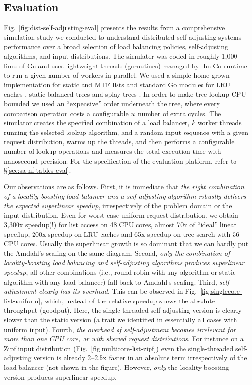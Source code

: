 \subsection{Evaluation}
\label{sec:sims}

Fig.~\ref{fig:dist-self-adjusting-eval} presents the results from a comprehensive simulation study we conducted to understand distributed self-adjusting systems performance over a broad selection of load balancing policies, self-adjusting algorithms, and input distributions. The simulator was coded in roughly 1,000 lines of Go and uses lightweight threads (goroutines) managed by the Go runtime to run a given number of workers in parallel. We used a simple home-grown implementation for static and MTF lists and standard Go modules for LRU caches \cite{golang-lru}, static balanced trees \cite{golang-btree} and splay trees \cite{golang-splay}. In order to make tree lookup CPU bounded we used an ``expensive'' order underneath the tree, where every comparison operation costs a configurable $w$ number of extra cycles. The simulator creates the specified combination of a load balancer, $k$ worker threads running the selected lookup algorithm, and a random input sequence with a given request distribution, warms up the threads, and then performs a configurable number of lookup operations and measures the total execution time with nanosecond precision. For the specification of the evaluation platform, refer to \S\ref{sec:sa-nf-tables-eval}.

Our observations are as follows. First, it is immediate that \emph{the right combination of a locality boosting load balancer and a self-adjusting algorithm robustly delivers the expected superlinear speedup}, irrespectively of the problem domain or the input distribution. Even for worst-case uniform request distribution, we obtain 3,300x speedup(!) for list access on 48 CPU cores, almost 70x of ``ideal'' linear speedup, 200x speedup on LRU caches and 65x speedup on tree search with 36 CPU cores. Usually the superlinear growth is so dominant that we can hardly put the Amdahl's scaling on the same diagram.  Second, \emph{only the combination of locality-boosting load balancing and self-adjusting algorithms produces superlinear speedup}, all other combinations (i.e., round robin with any algorithm or static algorithm with any load balancer) fall back to Amdahl's scaling.  Third, \emph{self-adjustment clearly has its overhead}. This can be observed in Fig.~\ref{fig:singlecore-list-uniform}, which, instead of the relative speedup shows the absolute throughput (goodput). Here, the single-threaded self-adjusting version is clearly slower than the static version (a trait we identified in essentially all cases with uniform input). Fourth, \emph{the overhead of self-adjustment becomes irrelevant for more than one CPU core, or with skewed request distributions}. For instance on a Zipf input distribution (Fig.~\ref{fig:multicore-list-zipf}) even the single-threaded self-adjusting version is already 2--2.5x faster in an absolute term irrespectively of the load balancer (not shown in the figure). However, \emph{only} the locality boosting version produces superlinear speedup.

